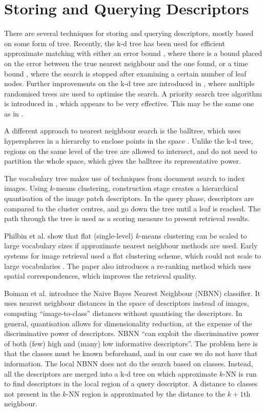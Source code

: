 \documentclass[11pt,a4paper]{kth-mag}
\begin{document}
\section{Storing and Querying Descriptors}
There are several techniques for storing and querying descriptors, mostly based
on some form of tree. Recently, the k-d tree\cite{bentley1975multidimensional,
  friedman1977algorithm} has been used for efficient approximate matching with
either an error bound \cite{arya1998optimal}, where there is a bound placed on
the error between the true nearest neighbour and the one found, or a time bound
\cite{beis1997shape}, where the search is stopped after examining a certain
number of leaf nodes. Further improvements on the k-d tree are introduced in
\cite{silpa2008optimised}, where multiple randomised trees are used to optimise
the search. A priority search tree algorithm is introduced in
\cite{muja2014scalable}, which appears to be very effective. This may be the
same one as in \cite{muja2009fast}.

A different approach to nearest neighbour search is the balltree, which uses
hyperspheres in a hierarchy to enclose points in the space
\cite{omohundro1989five}. Unlike the k-d tree, regions on the same level of the
tree are allowed to intersect, and do not need to partition the whole space,
which gives the balltree its representative power.

The vocabulary tree \cite{nister2006scalable} makes use of techniques from
document search to index images. Using $k$-means clustering, construction stage
creates a hierarchical quantisation of the image patch descriptors. In the query
phase, descriptors are compared to the cluster centres, and go down the tree
until a leaf is reached. The path through the tree is used as a scoring measure
to present retrieval results.

Philbin et al. \cite{philbin2007object} show that flat (single-level) $k$-means
clustering can be scaled to large vocabulary sizes if approximate nearest
neighbour methods are used. Early systems for image retrieval used a flat
clustering scheme, which could not scale to large vocabularies
\cite{sivic2003video}. The paper also introduces a re-ranking method which uses
spatial correspondences, which improves the retrieval quality.

Boiman et al. \cite{boiman2008defense} introduce the Naive Bayes Nearest
Neighbour (NBNN) classifier. It uses nearest neighbour distances in the space of
descriptors instead of images, computing ``image-to-class'' distances without
quantising the descriptors. In general, quantisation allows for dimensionality
reduction, at the expense of the discriminative power of descriptors. NBNN ``can
exploit the discriminative power of both (few) high and (many) low informative
descriptors''. The problem here is that the classes must be known beforehand,
and in our case we do not have that information. The local NBNN
\cite{mccann2012local} does not do the search based on classes. Instead, all the
descriptors are merged into a k-d tree on which approximate $k$-NN is run to
find descriptors in the local region of a query descriptor. A distance to
classes not present in the $k$-NN region is approximated by the distance to the
$k+1$th neighbour.
\end{document}
